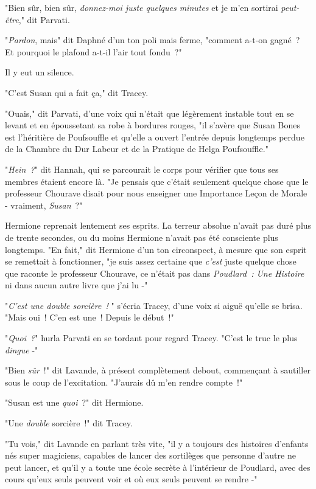 "Bien sûr, bien sûr, \emph{donnez-moi juste quelques minutes} et je m'en sortirai \emph{peut-être}," dit Parvati.

"\emph{Pardon}, mais" dit Daphné d'un ton poli mais ferme, "comment a-t-on gagné~? Et pourquoi le plafond a-t-il l'air tout fondu~?"

Il y eut un silence.

"C'est Susan qui a fait ça," dit Tracey.

"Ouais," dit Parvati, d'une voix qui n'était que légèrement instable tout en se levant et en époussetant sa robe à bordures rouges, "il s'avère que Susan Bones est l'héritière de Poufsouffle et qu'elle a ouvert l'entrée depuis longtemps perdue de la Chambre du Dur Labeur et de la Pratique de Helga Poufsouffle."

"\emph{Hein~?}" dit Hannah, qui se parcourait le corps pour vérifier que tous ses membres étaient encore là. "Je pensais que c'était seulement quelque chose que le professeur Chourave disait pour nous enseigner une Importance Leçon de Morale - vraiment, \emph{Susan}~?"

Hermione reprenait lentement ses esprits. La terreur absolue n'avait pas duré plus de trente secondes, ou du moins Hermione n'avait pas été consciente plus longtemps. "En fait," dit Hermione d'un ton circonspect, à mesure que son esprit se remettait à fonctionner, "je suis assez certaine que \emph{c'est} juste quelque chose que raconte le professeur Chourave, ce n'était pas dans \emph{Poudlard~: Une Histoire} ni dans aucun autre livre que j'ai lu -"

"\emph{C'est une double sorcière~!} " s'écria Tracey, d'une voix si aiguë qu'elle se brisa. "Mais oui~! C'en est une~! Depuis le début~!"

"\emph{Quoi~?}" hurla Parvati en se tordant pour regard Tracey. "C'est le truc le plus \emph{dingue} -"

"Bien \emph{sûr}~!" dit Lavande, à présent complètement debout, commençant à sautiller sous le coup de l'excitation. "J'aurais dû m'en rendre compte~!"

"Susan est une \emph{quoi}~?" dit Hermione.

"Une \emph{double} sorcière~!" dit Tracey.

"Tu vois," dit Lavande en parlant très vite, "il y a toujours des histoires d'enfants nés super magiciens, capables de lancer des sortilèges que personne d'autre ne peut lancer, et qu'il y a toute une école secrète à l'intérieur de Poudlard, avec des cours qu'eux seuls peuvent voir et où eux seuls peuvent se rendre -"

